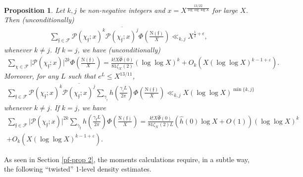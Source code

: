 \documentclass[11pt]{amsart}
\newcommand{\norm}{\mathrm{N}}
\newtheorem{prop}{Proposition}[section]
\numberwithin{equation}{section}
\theoremstyle{remark}
\begin{document}
\begin{prop}\label{Prop 2}
Let $k, j$ be non-negative integers and  $x=X^{\frac{13/22}{\log \log \log X}}$ for large  $X$. 
Then (unconditionally)
\begin{align*}
 \sum_{\mathfrak{f}\in\mathcal{F}}  \mathcal{P}(\chi_\mathfrak{f}; x)^{k}\overline{\mathcal{P}(\chi_\mathfrak{f}; x)^{j}} \Phi\left(\frac{\norm(\mathfrak{f})}{X}\right)
 \ll_{k, j}
X^{\frac{1}{2}+\epsilon},
\end{align*}
whenever $k\neq j$. If $k=j$,  we have (unconditionally)
\begin{align*}
 \sum_{\chi\in\mathcal{F}} \big|\mathcal{P}(\chi_\mathfrak{f}; x)\big|^{2k} \Phi\left(\frac{\norm(\mathfrak{f})}{X}\right)
 =\frac{k!X\widehat{\Phi}(0)}{81\zeta_\mathcal{K}(2)}  (\log\log X)^k+ O_{k}(X(\log\log X)^{k-1+\varepsilon}).
\end{align*}
Moreover, for any $L$ such that $e^{L}\le X^{13/11}$,
\begin{align*}
\sum_{\mathfrak{f}\in\mathcal{F}}  \mathcal{P}(\chi_\mathfrak{f}; x)^{k}\overline{\mathcal{P}(\chi_\mathfrak{f}; x)^{j}}\sum_{\gamma_{_\mathfrak{f}}} h\left( \frac{\gamma_{_\mathfrak{f}} L}
{2\pi}\right)\Phi\left(\frac{\norm(\mathfrak{f})}{X}\right)
\ll_{k, j}
X \left(\log \log X\right)^{\min\{k,j\}}
\end{align*}
whenever $k\neq j$. If $k=j$,  we have
\begin{align*}
 \sum_{\mathfrak{f}\in\mathcal{F}} \big|\mathcal{P}(\chi_\mathfrak{f}; x)\big|^{2k}\sum_{\gamma_{\mathfrak{f}}} h\left( \frac{\gamma_{\mathfrak{f}} L}{2\pi}\right)\Phi\left(\frac{\norm(\mathfrak{f})}{X}\right)
 =
 \frac{k!X\widehat{\Phi}(0)}{81\zeta_\mathcal{K}(2)L}     
\left(\hat{h}(0) \log X + O(1)\right) (\log\log X)^k\\
+ 
O_{k}(X(\log\log X)^{k-1+\varepsilon}).
\end{align*}
\end{prop}



As seen in Section \ref{pf-prop 2}, the moments calculations require, in a subtle way, the following ``twisted'' 1-level density estimates. 
\end{document}
